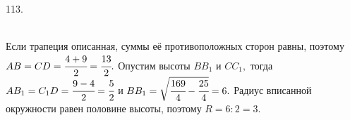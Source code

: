 113. \begin{figure}[ht!]
\end{figure}\\
Если трапеция описанная, суммы её противоположных сторон равны, поэтому $AB=CD=\cfrac{4+9}{2}=\cfrac{13}{2}.$ Опустим высоты $BB_1$ и $CC_1,$ тогда $AB_1=C_1D=\cfrac{9-4}{2}=\cfrac{5}{2}$ и $BB_1=\sqrt{\cfrac{169}{4}-\cfrac{25}{4}}=6.$ Радиус вписанной окружности равен половине высоты, поэтому $R=6:2=3.$\newpage\noindent
